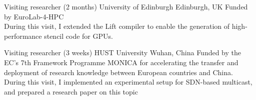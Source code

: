 \documentclass[11pt,a4paper,sans]{moderncv}        %
\begin{document}
					{Visiting researcher (2 months)}
					{University of Edinburgh}
					{Edinburgh, UK}{}
					{Funded by EuroLab-4-HPC\\
					 During this visit, I extended the Lift compiler to enable the generation of
					 high-performance stencil code for GPUs.
					}

					{Visiting researcher (3 weeks)}
					{HUST University}
					{Wuhan, China}{}
					{Funded by the EC’s 7th Framework Programme MONICA for accelerating the transfer
					 and deployment of research knowledge between European countries and China.
					 During this visit, I implemented an experimental setup for SDN-based multicast,
					 and prepared a research paper on this topic~\cite{humernbrum}
					}

\printbibheading[title={Publications}]
\printbibliography[heading=none]
%
%



\end{document}
